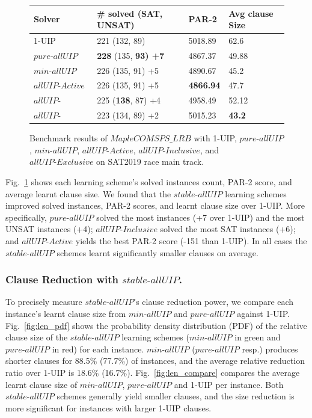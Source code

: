 \documentclass[runningheads]{llncs}
\newcommand{\allUip}{\textit{stable-allUIP}}
\newcommand{\allUipPure}{\textit{pure-allUIP}\xspace}
\newcommand{\allUipMin}{\textit{min-allUIP}\xspace}
\newcommand{\allUipAct}{\textit{allUIP-Active}}
\newcommand{\allUipIn}{\textit{allUIP-Inclusive}}
\newcommand{\allUipEx}{\textit{allUIP-Exclusive}}
\newcommand{\MapleBase}{\textit{MapleCOMSPS\_LRB}}
\begin{document}
\begin{figure} 
\begin{center}
\begin{tabular}{ | m{3.5cm} | m{4cm}| m{2cm} | m{2.75cm} |  } 
\hline
Solver & \# solved (SAT, UNSAT) & PAR-2 & Avg clause Size \\ 
\hline
1-UIP & 221 (132, 89)  & 5018.89 & 62.6  \\ 
\hline
$\allUipPure$ &\textbf{228} (135, \bf{93}) +7 & 4867.37 & 49.88 \\
\hline
$\allUipMin$ & 226 (135, 91) +5 & 4890.67 & 45.2 \\ 
\hline
$\allUipAct$ & 226 (135, 91)  +5 & \textbf{4866.94} & 47.7 \\
\hline
$\allUipIn$ & 225 (\textbf{138}, 87) +4 & 4958.49 & 52.12 \\
\hline
$\allUipEx$ & 223 (134, 89) +2& 5015.23& \textbf{43.2} \\
\hline
\end{tabular}
\end{center}
\caption{Benchmark results of $\MapleBase$ with 1-UIP, $\allUipPure$, $\allUipMin$, $\allUipAct$,
$\allUipIn$, and $\allUipEx$ on SAT2019 race main track.}
\label{fig:t4}
\end{figure}


Fig.~\ref{fig:t4} shows each learning scheme's solved instances count,
PAR-2 score, and average learnt clause size. We found that the
$\allUip$ learning schemes improved solved instances, PAR-2 scores,
and learnt clause size over 1-UIP. More specifically, $\allUipPure$
solved the most instances (+7 over 1-UIP) and the most UNSAT instances
(+4); $\allUipIn$ solved the most SAT instances (+6); and $\allUipAct$
yields the best PAR-2 score (-151 than 1-UIP). In all cases the
$\allUip$ schemes learnt significantly smaller clauses on average.

\subsubsection{Clause Reduction with $\allUip$.}
To precisely measure $\allUip$'s clause reduction power, we compare
each instance's learnt clause size from $\allUipMin$ and $\allUipPure$
against 1-UIP. Fig.~\ref{fig:len_pdf} shows the probability density
distribution (PDF) of the relative clause size of the $\allUip$
learning schemes ($\allUipMin$ in green and $\allUipPure$ in red) for
each instance. $\allUipMin$ ($\allUipPure$ resp.) produces shorter
clauses for 88.5\% (77.7\%) of instances, and the average relative
reduction ratio over 1-UIP is 18.6\%
(16.7\%). Fig.~\ref{fig:len_compare} compares the average learnt
clause size of $\allUipMin$, $\allUipPure$ and 1-UIP per instance.
Both $\allUip$ schemes generally yield smaller clauses, and the size
reduction is more significant for instances with larger 1-UIP clauses.
\end{document}
